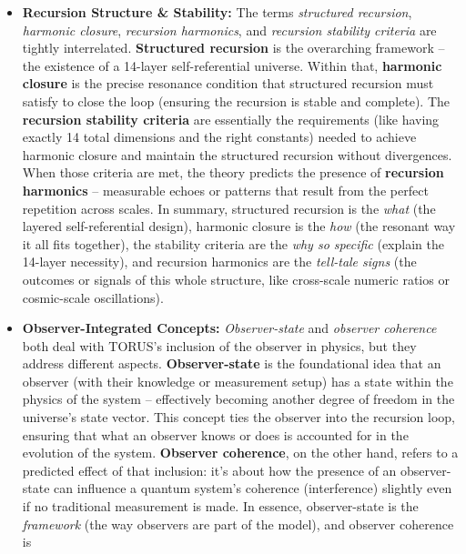 \documentclass[
]{article}
\begin{document}
\begin{itemize}
\item
  \textbf{Recursion Structure \& Stability:} The terms \emph{structured
  recursion}, \emph{harmonic closure}, \emph{recursion harmonics}, and
  \emph{recursion stability criteria} are tightly interrelated.
  \textbf{Structured recursion} is the overarching framework -- the
  existence of a 14-layer self-referential universe. Within that,
  \textbf{harmonic closure} is the precise resonance condition that
  structured recursion must satisfy to close the loop (ensuring the
  recursion is stable and complete). The \textbf{recursion stability
  criteria} are essentially the requirements (like having exactly 14
  total dimensions and the right constants) needed to achieve harmonic
  closure and maintain the structured recursion without
  divergences\hspace{0pt}. When those criteria are met, the theory
  predicts the presence of \textbf{recursion harmonics} -- measurable
  echoes or patterns that result from the perfect repetition across
  scales. In summary, structured recursion is the \emph{what} (the
  layered self-referential design), harmonic closure is the \emph{how}
  (the resonant way it all fits together), the stability criteria are
  the \emph{why so specific} (explain the 14-layer necessity), and
  recursion harmonics are the \emph{tell-tale signs} (the outcomes or
  signals of this whole structure, like cross-scale numeric ratios or
  cosmic-scale oscillations).
\item
  \textbf{Observer-Integrated Concepts:} \emph{Observer-state} and
  \emph{observer coherence} both deal with TORUS's inclusion of the
  observer in physics, but they address different aspects.
  \textbf{Observer-state} is the foundational idea that an observer
  (with their knowledge or measurement setup) has a state within the
  physics of the system -- effectively becoming another degree of
  freedom in the universe's state vector\hspace{0pt}. This concept ties
  the observer into the recursion loop, ensuring that what an observer
  knows or does is accounted for in the evolution of the system.
  \textbf{Observer coherence}, on the other hand, refers to a predicted
  effect of that inclusion: it's about how the presence of an
  observer-state can influence a quantum system's coherence
  (interference) slightly even if no traditional measurement is
  made\hspace{0pt}. In essence, observer-state is the \emph{framework}
  (the way observers are part of the model), and observer coherence is

\end{itemize}
\end{document}

